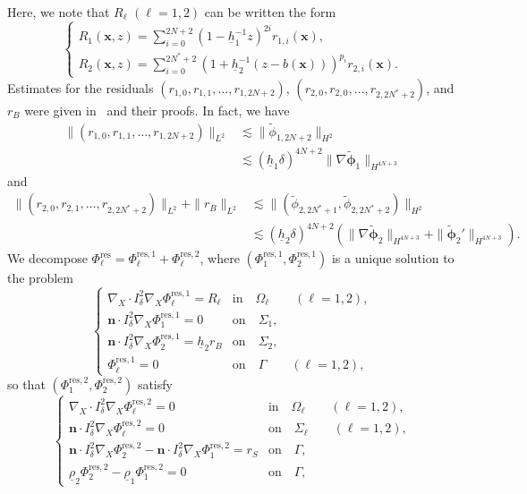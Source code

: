\documentclass[11pt,leqno]{article}
\numberwithin{equation}{section}
\numberwithin{figure}{section}
\begin{document}
%
Here, we note that $R_\ell$ $(\ell=1,2)$ can be written the form 
%
\[
\begin{cases}
 \displaystyle
  R_1(\bm{x},z) = \sum_{i=0}^{2N+2} (1-\underline{h}_1^{-1}z)^{2i}r_{1,i}(\bm{x}), \\[2.5ex]
 \displaystyle
  R_2(\bm{x},z) = \sum_{i=0}^{2N^*+2} (1+\underline{h}_2^{-1}(z-b(\bm{x})))^{p_i}r_{2,i}(\bm{x}). 
\end{cases}
\]
%
Estimates for the residuals $(r_{1,0},r_{1,1},\ldots,r_{1,2N+2})$, $(r_{2,0},r_{2,0},\ldots,r_{2,2N^*+2})$, and $r_B$ 
were given in~\cite[Lemmas 6.4 and 6.9]{Iguchi2018-2} and their proofs. 
In fact, we have 
%
\begin{align*}
\|(r_{1,0},r_{1,1},\ldots,r_{1,2N+2})\|_{L^2}
&\lesssim \|\tilde{\phi}_{1,2N+2}\|_{H^2} \\
&\lesssim (\underline{h}_1\delta)^{4N+2}\|\nabla\tilde{\bm{\phi}}_1\|_{H^{4N+3}}
\end{align*}
%
and 
%
\begin{align*}
\|(r_{2,0},r_{2,1},\ldots,r_{2,2N^*+2})\|_{L^2} + \|r_B\|_{L^2}
&\lesssim \|(\tilde{\phi}_{2,2N^*+1},\tilde{\phi}_{2,2N^*+2})\|_{H^2} \\
&\lesssim (\underline{h}_2\delta)^{4N+2}(\|\nabla\tilde{\bm{\phi}}_2\|_{H^{4N+3}}+\|\tilde{\bm{\phi}}_2'\|_{H^{4N+3}}).
\end{align*}
%
We decompose $\Phi_\ell^\mathrm{res} = \Phi_\ell^\mathrm{res,1} + \Phi_\ell^\mathrm{res,2}$, where 
$(\Phi_1^\mathrm{res,1},\Phi_2 ^\mathrm{res,1})$ is a unique solution to the problem 
%
\[
\begin{cases}
 \nabla_X\cdot I_\delta^2\nabla_X\Phi_\ell^\mathrm{res,1} = R_\ell & \mbox{in}\quad \Omega_\ell \qquad (\ell=1,2), \\
 \bm{n}\cdot I_\delta^2\nabla_X\Phi_1^\mathrm{res,1} = 0 & \mbox{on}\quad \Sigma_1, \\
 \bm{n}\cdot I_\delta^2\nabla_X\Phi_2^\mathrm{res,1} = \underline{h}_2r_B & \mbox{on}\quad \Sigma_2, \\
 \Phi_\ell^\mathrm{res,1} =0 &\mbox{on}\quad \Gamma \qquad (\ell=1,2), 
\end{cases}
\]
%
so that $(\Phi_1^\mathrm{res,2},\Phi_2^\mathrm{res,2})$ satisfy 
%
\begin{equation}\label{def-phi-res-2}
\begin{cases}
 \nabla_X\cdot I_\delta^2\nabla_X\Phi_\ell^\mathrm{res,2} = 0 & \mbox{in}\quad \Omega_\ell \qquad (\ell=1,2), \\
 \bm{n}\cdot I_\delta^2\nabla_X\Phi_\ell^\mathrm{res,2} = 0 & \mbox{on}\quad \Sigma_\ell \qquad (\ell=1,2), \\
 \bm{n}\cdot I_\delta^2\nabla_X\Phi_2^\mathrm{res,2}
  - \bm{n}\cdot I_\delta^2\nabla_X\Phi_1^\mathrm{res,2} = r_S &\mbox{on}\quad \Gamma, \\
 \underline{\rho}_2\Phi_2^\mathrm{res,2} - \underline{\rho}_1\Phi_1^\mathrm{res,2} = 0 &\mbox{on}\quad \Gamma, 
\end{cases}
\end{equation}
\end{document}

